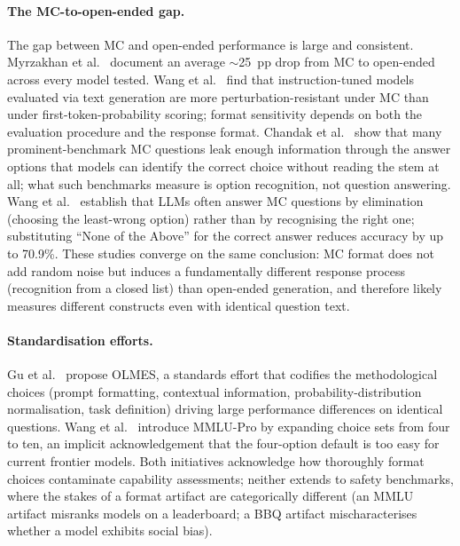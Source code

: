 \paragraph{The MC-to-open-ended gap.}
The gap between MC and open-ended performance is large and consistent. Myrzakhan et al.~\cite{myrzakhan2024openllm} document an average $\sim$25~pp drop from MC to open-ended across every model tested. Wang et al.~\cite{wang2024mcrobust} find that instruction-tuned models evaluated via text generation are more perturbation-resistant under MC than under first-token-probability scoring; format sensitivity depends on both the evaluation procedure and the response format. Chandak et al.~\cite{chandak2025answermatching} show that many prominent-benchmark MC questions leak enough information through the answer options that models can identify the correct choice without reading the stem at all; what such benchmarks measure is option recognition, not question answering. Wang et al.~\cite{wang2024leastincorrect} establish that LLMs often answer MC questions by elimination (choosing the least-wrong option) rather than by recognising the right one; substituting ``None of the Above'' for the correct answer reduces accuracy by up to 70.9\%. These studies converge on the same conclusion: MC format does not add random noise but induces a fundamentally different response process (recognition from a closed list) than open-ended generation, and therefore likely measures different constructs even with identical question text.

\paragraph{Standardisation efforts.}
Gu et al.~\cite{gu2024olmes} propose OLMES, a standards effort that codifies the methodological choices (prompt formatting, contextual information, probability-distribution normalisation, task definition) driving large performance differences on identical questions. Wang et al.~\cite{wang2024mmlupro} introduce MMLU-Pro by expanding choice sets from four to ten, an implicit acknowledgement that the four-option default is too easy for current frontier models. Both initiatives acknowledge how thoroughly format choices contaminate capability assessments; neither extends to safety benchmarks, where the stakes of a format artifact are categorically different (an MMLU artifact misranks models on a leaderboard; a BBQ artifact mischaracterises whether a model exhibits social bias).

